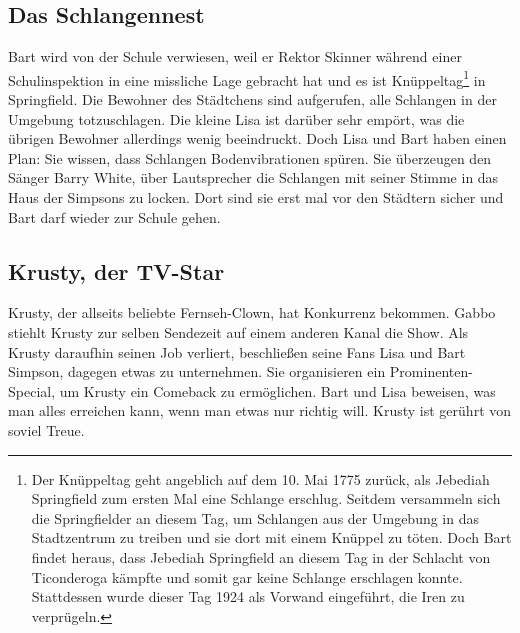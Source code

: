 	
\subsection{Das Schlangennest}\label{9F18}
Bart wird von der Schule verwiesen, weil er Rektor Skinner während einer Schulinspektion in eine missliche Lage gebracht hat und es ist Knüppeltag\footnote{Der Knüppeltag geht angeblich auf dem 10. Mai 1775 zurück, als Jebediah Springfield zum ersten Mal eine Schlange erschlug. Seitdem versammeln sich die Springfielder an diesem Tag, um Schlangen aus der Umgebung in das Stadtzentrum zu treiben und sie dort mit einem Knüppel zu töten.
Doch Bart findet heraus, dass Jebediah Springfield an diesem Tag in der Schlacht von Ticonderoga kämpfte und somit gar keine Schlange erschlagen konnte. Stattdessen wurde dieser Tag 1924 als Vorwand eingeführt, die Iren zu verprügeln.} in Springfield. Die Bewohner des Städtchens sind aufgerufen, alle Schlangen in der Umgebung totzuschlagen. Die kleine Lisa ist darüber sehr empört, was die übrigen Bewohner allerdings wenig beeindruckt. Doch Lisa und Bart haben einen Plan: Sie wissen, dass Schlangen Bodenvibrationen spüren. Sie überzeugen den Sänger Barry White, über Lautsprecher die Schlangen mit seiner Stimme in das Haus der Simpsons zu locken. Dort sind sie erst mal vor den Städtern sicher und Bart darf wieder zur Schule gehen.


	
\subsection{Krusty, der TV-Star}\label{9F19}
Krusty, der allseits beliebte Fernseh-Clown, hat Konkurrenz bekommen. Gabbo stiehlt Krusty zur selben Sendezeit auf einem anderen Kanal die Show. Als Krusty daraufhin seinen Job verliert, beschließen seine Fans Lisa und Bart Simpson, dagegen etwas zu unternehmen. Sie organisieren ein Prominenten-Special, um Krusty ein Comeback zu ermöglichen. Bart und Lisa beweisen, was man alles erreichen kann, wenn man etwas nur richtig will. Krusty ist gerührt von soviel Treue.

